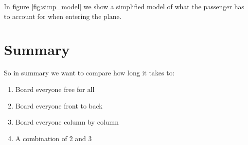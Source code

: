 \documentclass{article}
\begin{document}
In figure \ref{fig:simp_model} we show a simplified model of what the passenger has to account
for when entering the plane. 


\section{Summary}
So in summary we want to compare how long it takes to:
\begin{enumerate}
    \item Board everyone free for all
    \item Board everyone front to back
    \item Board everyone column by column
    \item A combination of 2 and 3
\end{enumerate}
\end{document}
